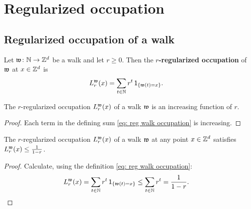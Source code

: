 \section{Regularized occupation}


\subsection*{Regularized occupation of a walk}

\begin{definition}
  \label{def:walkRegOccup}
  \leanok
  Let $\mathfrak{w} \colon \mathbb{N} \to \mathbb{Z}^d$ be a walk and let $r \ge 0$.
  Then the \textbf{$r$-regularized occupation}
  of $\mathfrak{w}$ at $x \in \mathbb{Z}^d$ is
  \begin{align}\label{eq: reg walk occupation}
  L^{\mathfrak{w}}_r(x) = \sum_{t \in \mathbb{N}} r^t \, \mathsf{1}_{\left\{ \mathfrak{w}(t) = x \right\}} .
  \end{align}
\end{definition}

\begin{lemma}
  \label{lem:walkRegOccup_incr}
  The $r$-regularized occupation $L^{\mathfrak{w}}_r(x)$
  of a walk $\mathfrak{w}$ is an increasing
  function of $r$.
\end{lemma}
\begin{proof}
Each term in the defining sum \eqref{eq: reg walk occupation}
is increasing.
\end{proof}

\begin{lemma}
  \label{lem:walk_regOcc_geometric_bound}
  The $r$-regularized occupation $L^{\mathfrak{w}}_r(x)$
  of a walk $\mathfrak{w}$ at any point $x \in \mathbb{Z}^d$
  satisfies $L^{\mathfrak{w}}_r(x) \le \frac{1}{1-r}$.
\end{lemma}
\begin{proof}
Calculate, using the definition \eqref{eq: reg walk occupation}:
\begin{align*}
L^{\mathfrak{w}}_r(x) = \sum_{t \in \mathbb{N}} r^t \, \mathsf{1}_{\left\{ \mathfrak{w}(t) = x \right\}}
    \le \sum_{t \in \mathbb{N}} r^t = \frac{1}{1-r}.
\end{align*}
\end{proof}

